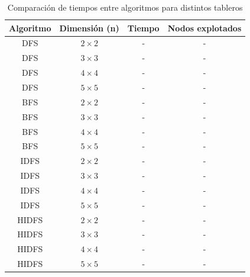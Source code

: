 \documentclass[%
	final,
	reprint,
	notitlepage,
	narroweqnarray,
	inline,
	twoside,
	invited
	]{ieee}
\begin{document}
\begin{table}[H]
\begin{center}
\begin{tabular}{|c|c|c|c|}
\hline
Algoritmo & Dimensión (n) & Tiempo & Nodos explotados\\
\hline
\hline

DFS & $2\times2$ & - & -\\
DFS & $3\times3$ & - & -\\
DFS & $4\times4$ & - & -\\
DFS & $5\times5$ & - & -\\
\hline
BFS & $2\times2$ & - & -\\
BFS & $3\times3$ & - & -\\
BFS & $4\times4$ & - & -\\
BFS & $5\times5$ & - & -\\
\hline
IDFS & $2\times2$ & - & -\\
IDFS & $3\times3$ & - & -\\
IDFS & $4\times4$ & - & -\\
IDFS & $5\times5$ & - & -\\
\hline
HIDFS & $2\times2$ & - & -\\
HIDFS & $3\times3$ & - & -\\
HIDFS & $4\times4$ & - & -\\
HIDFS & $5\times5$ & - & -\\

\hline  
\end{tabular}
\end{center}
\caption{Comparación de tiempos entre algoritmos para distintos tableros}
\label{tabla1}
\end{table}
\end{document}
